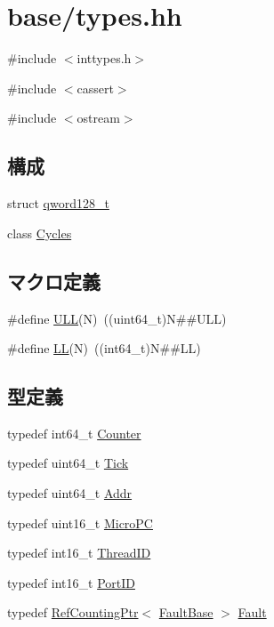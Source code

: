 \hypertarget{base_2types_8hh}{
\section{base/types.hh}
\label{base_2types_8hh}
}
{\ttfamily \#include $<$inttypes.h$>$}\par
{\ttfamily \#include $<$cassert$>$}\par
{\ttfamily \#include $<$ostream$>$}\par
\subsection*{構成}
\begin{DoxyCompactItemize}
\item 
struct \hyperlink{structqword128__t}{qword128\_\-t}
\item 
class \hyperlink{classCycles}{Cycles}
\end{DoxyCompactItemize}
\subsection*{マクロ定義}
\begin{DoxyCompactItemize}
\item 
\#define \hyperlink{base_2types_8hh_adcc3cf526a71c0dfaae020d432c78b83}{ULL}(N)~((uint64\_\-t)N\#\#ULL)
\item 
\#define \hyperlink{base_2types_8hh_a959db1cfc6f9f5c23aefcda92bfc763e}{LL}(N)~((int64\_\-t)N\#\#LL)
\end{DoxyCompactItemize}
\subsection*{型定義}
\begin{DoxyCompactItemize}
\item 
typedef int64\_\-t \hyperlink{base_2types_8hh_ae1475755791765b8e6f6a8bb091e273e}{Counter}
\item 
typedef uint64\_\-t \hyperlink{base_2types_8hh_a5c8ed81b7d238c9083e1037ba6d61643}{Tick}
\item 
typedef uint64\_\-t \hyperlink{base_2types_8hh_af1bb03d6a4ee096394a6749f0a169232}{Addr}
\item 
typedef uint16\_\-t \hyperlink{base_2types_8hh_adfb4d8b20c5abc8be73dd367b16f2d57}{MicroPC}
\item 
typedef int16\_\-t \hyperlink{base_2types_8hh_ab39b1a4f9dad884694c7a74ed69e6a6b}{ThreadID}
\item 
typedef int16\_\-t \hyperlink{base_2types_8hh_acef4d7d41cb21fdc252e20c04cd7bb8e}{PortID}
\item 
typedef \hyperlink{classRefCountingPtr}{RefCountingPtr}$<$ \hyperlink{classFaultBase}{FaultBase} $>$ \hyperlink{base_2types_8hh_a79b31ca450eaa665c335a928cb98b834}{Fault}
\end{DoxyCompactItemize}

